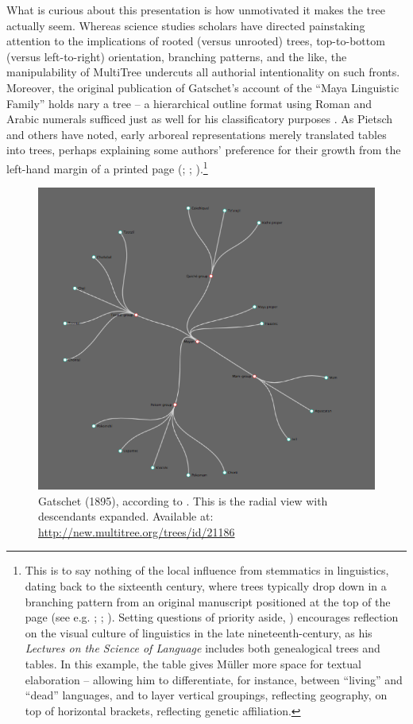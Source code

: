 \documentclass[output=paper]{langscibook}
\begin{document}
What is curious about this presentation is how unmotivated it makes the tree actually seem. Whereas science studies scholars have directed painstaking attention to the implications of rooted (versus unrooted) trees, top-to-bottom (versus left-to-right) orientation, branching patterns, and the like, the manipulability of MultiTree undercuts all authorial intentionality on such fronts. Moreover, the original publication of Gatschet's account of the ``Maya Linguistic Family'' holds nary a tree -- a hierarchical outline format using Roman and Arabic numerals sufficed just as well for his classificatory purposes \citep[250--251]{GatschetCampbell1973}. As Pietsch and others have noted, early arboreal representations merely translated tables into trees, perhaps explaining some authors' preference for their growth from the left-hand margin of a printed page (\citealt[51]{Wells1987}; \citealt[7-10]{Pietsch2012}; \citealt[57]{Archibald2014}).\footnote{This is to say nothing of the local influence from stemmatics in linguistics, dating back to the sixteenth century, where trees typically drop down in a branching pattern from an original manuscript positioned at the top of the page (see e.g. \citealt{Maher1966}; \citealt{Hoenigswald1975}; \citealt{Cameron1987}). Setting questions of priority aside, \citet[vol. I, 537]{Mueller19131891}) encourages reflection on the visual culture of linguistics in the late nineteenth-century, as his \emph{Lectures on the Science of Language} includes both genealogical trees and tables. In this example, the table gives Müller more space for textual elaboration -- allowing him to differentiate, for instance, between ``living'' and ``dead'' languages, and to layer vertical groupings, reflecting geography, on top of horizontal brackets, reflecting genetic affiliation.}

\begin{figure}
    \centering
    \includegraphics[scale=0.8]{figures/gatschet1895.png}
    \caption{Gatschet (1895), according to \citet{GatschetCampbell1973}. This is the radial view with descendants expanded. Available at: \url{http://new.multitree.org/trees/id/21186}}
    \label{fig:kaplan:gatschet}
\end{figure}
\end{document}
